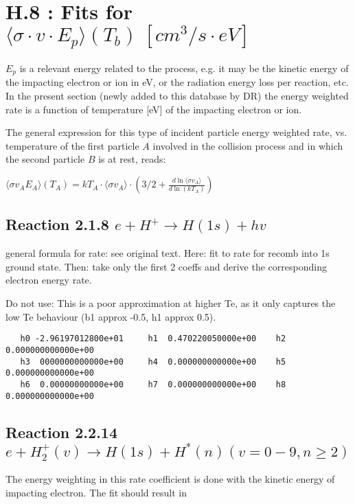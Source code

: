 \newpage

\section{H.8 : Fits for $\langle\sigma \cdot v \cdot E_p \rangle (T_b) \ [cm^3/s
\cdot eV]$}

$E_p$ is a relevant energy related to the process, e.g. it may be the kinetic energy of the impacting electron or ion in eV,
or the radiation energy loss per reaction, etc.
In the present section (newly added to this database by DR)
the energy weighted rate is a function of temperature [eV] of the
impacting electron or ion.

The general expression for this type of incident particle energy weighted
rate, vs. temperature of the first particle $A$ involved in the collision process
and in which the second particle $B$ is at rest, reads:

$\langle\sigma v_A E_{A}\rangle(T_A) = kT_A \cdot \langle\sigma v_A\rangle \cdot
\left(3/2 + \frac{d \ln \langle\sigma v_A\rangle}{d \ln(kT_A)}\right)$

\newpage

\subsection{
Reaction 2.1.8  $  e + H^+ \rightarrow H(1s) + hv $}
general formula for rate: see original text. Here:  fit to rate for recomb into
1s ground state.
Then: take only the first 2 coeffs and derive the corresponding electron energy rate.


Do not use: This is a poor approximation at higher Te, as it only captures the low Te
behaviour (b1 approx -0.5, h1 approx 0.5).



\begin{small}\begin{verbatim}
   h0 -2.96197012800e+01     h1  0.470220050000e+00    h2  0.000000000000e+00
   h3  0000000000000e+00     h4  0.000000000000e+00    h5  0.000000000000e+00
   h6  0.00000000000e+00     h7  0.000000000000e+00    h8  0.000000000000e+00
\end{verbatim}\end{small}

\subsection{
Reaction 2.2.14   $e + H_2^+(v) \rightarrow H(1s) + H^*(n)   (v=0-9, n \ge 2) $
}
The energy weighting in this rate coefficient is done with the kinetic energy of
impacting electron.
The fit should result in

